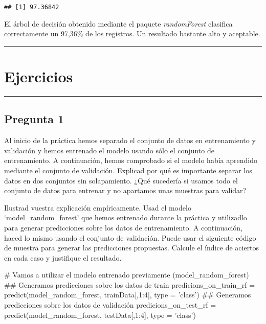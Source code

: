 \documentclass[]{article}
\newenvironment{Shaded}{\begin{snugshade}}{\end{snugshade}}
\newcommand{\KeywordTok}[1]{\textcolor[rgb]{0.94,0.87,0.69}{#1}}
\newcommand{\DataTypeTok}[1]{\textcolor[rgb]{0.87,0.87,0.75}{#1}}
\newcommand{\DecValTok}[1]{\textcolor[rgb]{0.86,0.86,0.80}{#1}}
\newcommand{\StringTok}[1]{\textcolor[rgb]{0.80,0.58,0.58}{#1}}
\newcommand{\CommentTok}[1]{\textcolor[rgb]{0.50,0.62,0.50}{#1}}
\newcommand{\OperatorTok}[1]{\textcolor[rgb]{0.94,0.94,0.82}{#1}}
\newcommand{\NormalTok}[1]{\textcolor[rgb]{0.80,0.80,0.80}{#1}}
\begin{document}
\begin{verbatim}
## [1] 97.36842
\end{verbatim}

El árbol de decisión obtenido mediante el paquete \emph{randomForest}
clasifica correctamente un 97,36\% de los registros. Un resultado
bastante alto y aceptable.

\begin{center}\rule{0.5\linewidth}{\linethickness}\end{center}

\section{Ejercicios}\label{ejercicios}

\begin{center}\rule{0.5\linewidth}{\linethickness}\end{center}

\subsection{Pregunta 1}\label{pregunta-1}

Al inicio de la práctica hemos separado el conjunto de datos en
entrenamiento y validación y hemos entrenado el modelo usando sólo el
conjunto de entrenamiento. A continuación, hemos comprobado si el modelo
había aprendido mediante el conjunto de validación. Explicad por qué es
importante separar los datos en dos conjuntos sin solapamiento. ¿Qué
sucedería si usamos todo el conjunto de datos para entrenar y no
apartamos unas muestras para validar?

Ilustrad vuestra explicación empíricamente. Usad el modelo
`model\_random\_forest' que hemos entrenado durante la práctica y
utilizadlo para generar predicciones sobre los datos de entrenamiento. A
continuación, haced lo mismo usando el conjunto de validación. Puede
usar el siguiente código de muestra para generar las predicciones
propuestas. Calcule el índice de aciertos en cada caso y justifique el
resultado.

\begin{Shaded}
\begin{Highlighting}[]
\CommentTok{# Vamos a utilizar el modelo entrenado previamente (model_random_forest)}
\NormalTok{## Generamos predicciones sobre los datos de train}
\NormalTok{predicions_on_train_rf =}\StringTok{ }\KeywordTok{predict}\NormalTok{(model_random_forest, trainData[,}\DecValTok{1}\OperatorTok{:}\DecValTok{4}\NormalTok{], }\DataTypeTok{type =} \StringTok{'class'}\NormalTok{)}
\NormalTok{## Generamos predicciones sobre los datos de validación}
\NormalTok{predicions_on_test_rf  =}\StringTok{ }\KeywordTok{predict}\NormalTok{(model_random_forest,  testData[,}\DecValTok{1}\OperatorTok{:}\DecValTok{4}\NormalTok{], }\DataTypeTok{type =} \StringTok{'class'}\NormalTok{)}
\end{Highlighting}
\end{Shaded}
\end{document}
